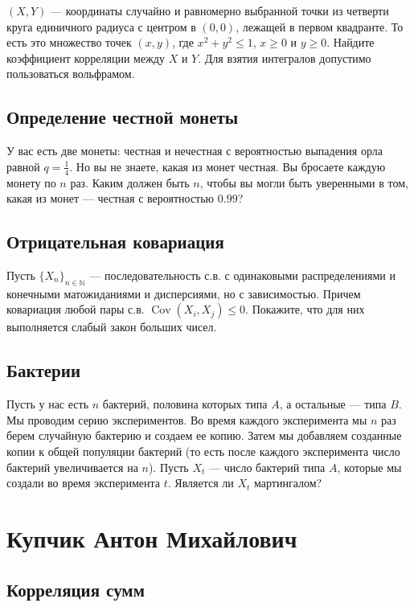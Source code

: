 \documentclass[12pt]{article}
\newcommand\N{\mathbb{N}}
\DeclareMathOperator{\Cov}{Cov}
\begin{document}
$(X, Y)$ --- координаты случайно и равномерно выбранной точки из четверти круга единичного радиуса с центром в $(0, 0)$, лежащей в первом квадранте. То есть это множество точек $(x, y)$, где $x^2 + y^2 \le 1$, $x \ge 0$ и $y \ge 0$. Найдите коэффициент корреляции между $X$ и $Y$. Для взятия интегралов  допустимо пользоваться вольфрамом.


\subsection{Определение честной монеты}

У вас есть две монеты: честная и нечестная с вероятностью выпадения орла равной $q = \frac{1}{4}$. Но вы не знаете, какая из монет честная. Вы бросаете каждую монету по $n$ раз. Каким должен быть $n$, чтобы вы могли быть уверенными в том, какая из монет --- честная с вероятностью $0.99$? 


\subsection{Отрицательная ковариация}

Пусть $\{X_n\}_{n \in \N}$ --- последовательность с.в. с одинаковыми распределениями и конечными матожиданиями и дисперсиями, но с зависимостью. Причем ковариация любой пары с.в. $\Cov(X_i, X_j) \le 0$. Покажите, что для них выполняется слабый закон больших чисел.


\subsection{Бактерии}

Пусть у нас есть $n$ бактерий, половина которых типа $A$, а остальные --- типа $B$. Мы проводим серию экспериментов. Во время каждого эксперимента мы $n$ раз берем случайную бактерию и создаем ее копию. Затем мы добавляем созданные копии к общей популяции бактерий (то есть после каждого эксперимента число бактерий увеличивается на $n$). Пусть $X_t$ --- число бактерий типа $A$, которые мы создали во время эксперимента $t$. Является ли $X_t$ мартингалом?


\newpage
\section{Купчик Антон Михайлович}

\subsection{Корреляция сумм}
\end{document}
